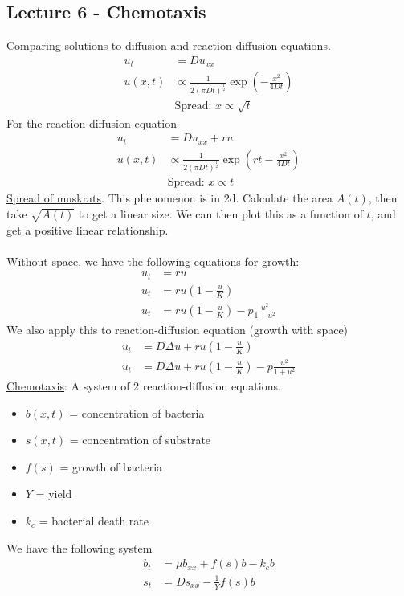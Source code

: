 \documentclass[12pt, letterpaper]{article}
\begin{document}
\subsection{Lecture 6 - Chemotaxis}
Comparing solutions to diffusion and reaction-diffusion equations.
\begin{align*}
    u_t &= Du_{xx} \\
    u(x,t) & \propto \frac{1}{2(\pi D t)^\frac 12}\exp\left(-\frac{x^2}{4Dt}\right) \\
    &\text{Spread: } x \propto \sqrt{t}
\end{align*}
For the reaction-diffusion equation
\begin{align*}
    u_t &= Du_{xx} + ru \\
    u(x,t) &\propto \frac{1}{2(\pi Dt)^\frac 12}\exp\left(rt - \frac{x^2}{4Dt}\right)  \\
    &\text{Spread: } x \propto t
\end{align*}
\underline{Spread of muskrats}.
This phenomenon is in 2d. Calculate the area $A(t)$, then take $\sqrt{A(t)}$ to get a linear 
size. We can then plot this as a function of $t$, and get a positive linear relationship. \\ \\
Without space, we have the following equations for growth:
\begin{align*}
    u_t &= ru \tag{exponential}\\
    u_t &= ru(1-\frac uK) \tag{logistic}\\
    u_t &= ru(1-\frac uK)-p\frac{u^2}{1+u^2}\tag{predation}
\end{align*}
We also apply this to reaction-diffusion equation (growth with space)
\begin{align*}
    u_t &= D\Delta u + ru(1-\frac{u}{K}) \\
    u_t &= D\Delta u + ru(1-\frac{u}{K}) - p \frac{u^2}{1+u^2}
\end{align*}
\underline{Chemotaxis}: A system of 2 reaction-diffusion equations.
\begin{itemize}
    \item $b(x,t)$ = concentration of bacteria
    \item $s(x,t)$ = concentration of substrate
    \item $f(s)$ = growth of bacteria
    \item $Y$ = yield
    \item $k_c$ = bacterial death rate
\end{itemize}
We have the following system
\begin{align*}
    b_t &= \mu b_{xx} + f(s)b - k_cb\\
    s_t &= Ds_{xx} - \frac 1Y f(s)b 
\end{align*}
\end{document}
